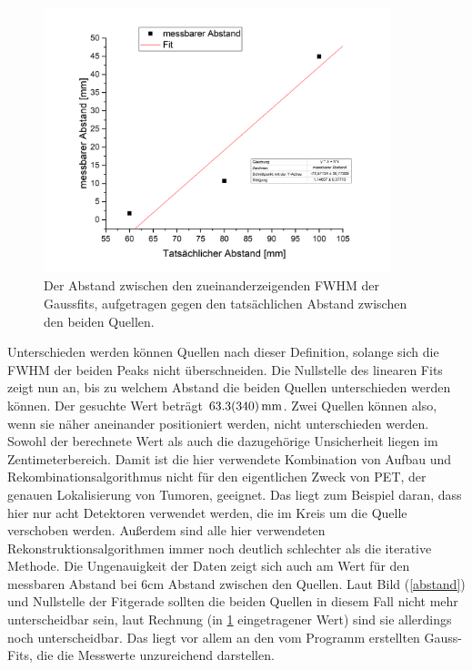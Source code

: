 \begin{figure}[h]
	\centering
	\includegraphics[width=0.9\textwidth]{abstand_fit.png}
	\caption{Der Abstand zwischen den zueinanderzeigenden FWHM der Gaussfits, aufgetragen gegen den tatsächlichen Abstand zwischen den beiden Quellen.}
	\label{abstand_fit}
\end{figure}

Unterschieden werden können Quellen nach dieser Definition, solange sich die FWHM der beiden Peaks nicht überschneiden. Die Nullstelle des linearen Fits zeigt nun an, bis zu welchem Abstand die beiden Quellen unterschieden werden können. Der gesuchte Wert beträgt $\SI{63,3\pm34,0}{mm}$. Zwei Quellen können also, wenn sie näher aneinander positioniert werden, nicht unterschieden werden. Sowohl der berechnete Wert als auch die dazugehörige Unsicherheit liegen im Zentimeterbereich. Damit ist die hier verwendete Kombination von Aufbau und Rekombinationsalgorithmus nicht für den eigentlichen Zweck von PET, der genauen Lokalisierung von Tumoren, geeignet. Das liegt zum Beispiel daran, dass hier nur acht Detektoren verwendet werden, die im Kreis um die Quelle verschoben werden. Außerdem sind alle hier verwendeten Rekonstruktionsalgorithmen immer noch deutlich schlechter als die iterative Methode. Die Ungenauigkeit der Daten zeigt sich auch am Wert für den messbaren Abstand bei 6cm Abstand zwischen den Quellen. Laut Bild (\cref{abstand}) und Nullstelle der Fitgerade sollten die beiden Quellen in diesem Fall nicht mehr unterscheidbar sein, laut Rechnung (in \cref{abstand_fit} eingetragener Wert) sind sie allerdings noch unterscheidbar. Das liegt vor allem an den vom Programm erstellten Gauss-Fits, die die Messwerte unzureichend darstellen.
